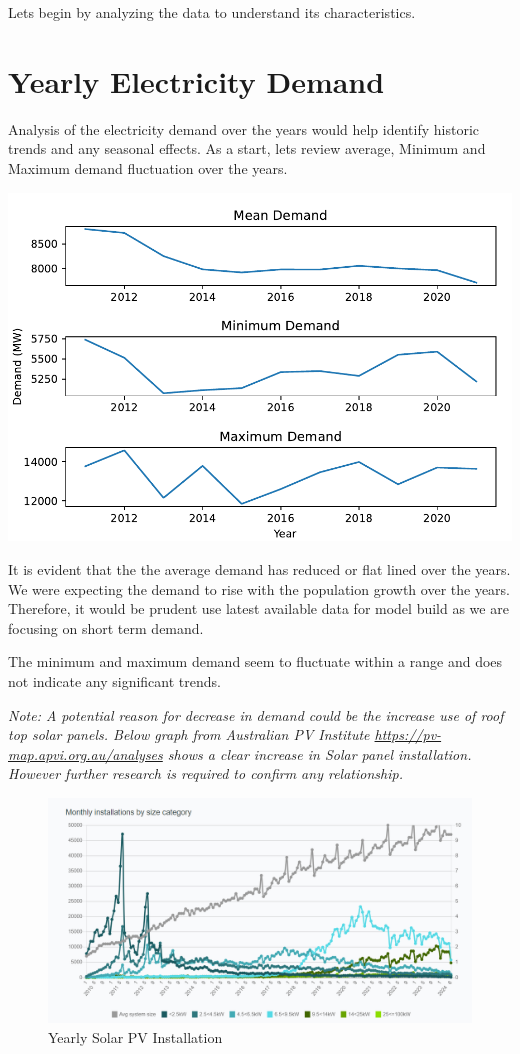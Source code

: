 \documentclass[mstat,12pt]{unswthesis}
\begin{document}
Lets begin by analyzing the data to understand its characteristics.

\section{Yearly Electricity Demand}\label{yearly-electricity-demand}

Analysis of the electricity demand over the years would help identify
historic trends and any seasonal effects. As a start, lets review
average, Minimum and Maximum demand fluctuation over the years.

\begin{center}\includegraphics[width=0.5\linewidth]{unsw-ZZSC9020-report-template_files/figure-latex/unnamed-chunk-2-1} \end{center}

It is evident that the the average demand has reduced or flat lined over
the years. We were expecting the demand to rise with the population
growth over the years. Therefore, it would be prudent use latest
available data for model build as we are focusing on short term demand.

The minimum and maximum demand seem to fluctuate within a range and does
not indicate any significant trends.

\textit{Note: A potential reason for decrease in demand could be the increase use of roof top solar panels. Below graph from Australian PV Institute \url{https://pv-map.apvi.org.au/analyses} shows a clear increase in Solar panel installation. However further research is required to confirm any relationship.}

\begin{figure}[!h]
  \includegraphics[width=0.4\linewidth]{AusPVInst.PNG}
  \caption{Yearly Solar PV Installation}
  \label{fig:Solar PV Installation }
\end{figure}
\end{document}

